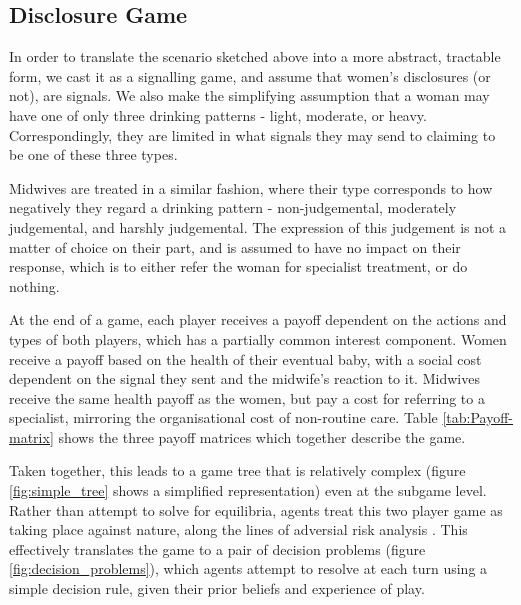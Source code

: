 \subsection{Disclosure Game}
\label{sub:the_game}

In order to translate the scenario sketched above into a more abstract, tractable form, we cast it as a signalling game, and assume that women's disclosures (or not), are signals. We also make the simplifying assumption that a woman may have one of only three drinking patterns - light, moderate, or heavy. Correspondingly, they are limited in what signals they may send to claiming to be one of these three types.

Midwives are treated in a similar fashion, where their type corresponds to how negatively they regard a drinking pattern - non-judgemental, moderately judgemental, and harshly judgemental. The expression of this judgement is not a matter of choice on their part, and is assumed to have no impact on their response, which is to either refer the woman for specialist treatment, or do nothing.

At the end of a game, each player receives a payoff dependent on the actions and types of both players, which has a partially common interest component. Women receive a payoff based on the health of their eventual baby, with a social cost dependent on the signal they sent and the midwife's reaction to it. Midwives receive the same health payoff as the women, but pay a cost for referring to a specialist, mirroring the organisational cost of non-routine care. Table \ref{tab:Payoff-matrix} shows the three payoff matrices which together describe the game.

Taken together, this leads to a game tree that is relatively complex (figure \ref{fig:simple_tree} shows a simplified representation) even at the subgame level. Rather than attempt to solve for equilibria, agents treat this two player game as taking place against nature, along the lines of adversial risk analysis \citep{RiosInsua2009}. This effectively translates the game to a pair of decision problems (figure \ref{fig:decision_problems}), which agents attempt to resolve at each turn using a simple decision rule, given their prior beliefs and experience of play.

